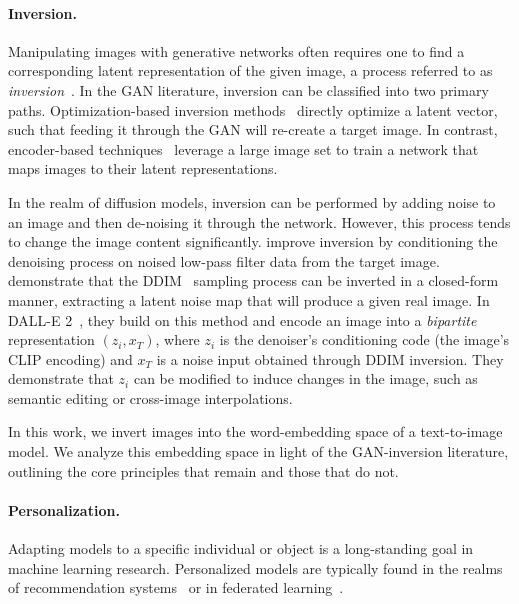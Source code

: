 \paragraph{Inversion.}
Manipulating images with generative networks often requires one to find a corresponding latent representation of the given image, a process referred to as \textit{inversion}~\citep{zhu2016generative,lipton2017precise,creswell2018inverting,yeh2017semantic,xia2021gan}.
In the GAN literature, inversion can be classified into two primary paths. Optimization-based inversion methods~\citep{abdal2019image2stylegan,abdal2020image2stylegan++,semantic2019bau,zhu2020improved,gu2020image, xu2021continuity,roich2021pivotal} directly optimize a latent vector, such that feeding it through the GAN will re-create a target image. In contrast, encoder-based techniques~\citep{zhu2020domain,pidhorskyi2020adversarial,guan2020collaborative,richardson2020encoding,tov2021designing,alaluf2021restyle,kang2021gan,kim2021exploiting,parmar2022spatially} leverage a large image set to train a network that maps images to their latent representations. 

In the realm of diffusion models, inversion can be performed  by adding noise to an image and then de-noising it through the network. However, this process tends to change the image content significantly. \citet{choi2021ilvr} improve inversion by conditioning the denoising process on noised low-pass filter data from the target image.
\citep{dhariwal2021diffusion} demonstrate that the DDIM~\citep{song2020denoising} sampling process can be inverted in a closed-form manner, extracting a latent noise map that will produce a given real image. In DALL-E 2~\citep{ramesh2022hierarchical}, they build on this method and encode an image into a \textit{bipartite} representation $(z_i, x_T)$, where $z_i$ is the denoiser's conditioning code (\ie the image's CLIP encoding) and $x_T$ is a noise input obtained through DDIM inversion. They demonstrate that $z_i$ can be modified to induce changes in the image, such as semantic editing or cross-image interpolations.

In this work, we invert images into the word-embedding space of a text-to-image model. We analyze this embedding space in light of the GAN-inversion literature, outlining the core principles that remain and those that do not.




\paragraph{Personalization.}
Adapting models to a specific individual or object is a long-standing goal in machine learning research. Personalized models are typically found in the realms of recommendation systems~\citep{benhamdi2017personalized,fernando2018artwork,martinez2009s,cho2002personalized} or in federated learning~\citep{mansour2020three,jiang2019improving,fallah2020personalized}.

